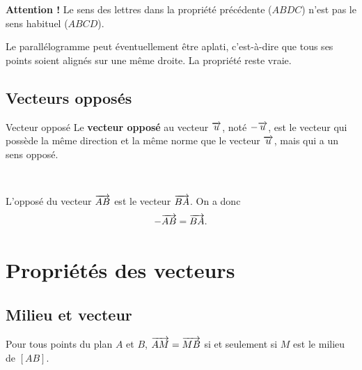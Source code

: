 \documentclass[11pt]{article}
\begin{document}
\begin{rmq}
  \textbf{Attention !} Le sens des lettres dans la propriété précédente ($ABDC$)
  n'est pas le sens habituel ($ABCD$).
\end{rmq}%
\vspace{-.5cm}
\begin{rmq}
  Le parallélogramme peut éventuellement être aplati, c'est-à-dire que tous ses
  points soient alignés sur une même droite. La propriété reste vraie.
\end{rmq}
\vspace{-.5cm}

\subsection{Vecteurs opposés}
\begin{defi}{Vecteur opposé}
  Le \textbf{vecteur opposé} au vecteur $\overrightarrow{u}$, noté $-\overrightarrow{u}$, est le
  vecteur qui possède la même direction et la même norme que le vecteur $\overrightarrow{u}$, mais qui a un sens opposé.
\end{defi}
\begin{prop}~\\[-2mm]
  \begin{minipage}[]{.6\textwidth}
  L'opposé du vecteur $\overrightarrow{AB}$ est le vecteur $\overrightarrow{BA}$. On a donc
  \[
    -\overrightarrow{AB} = \overrightarrow{BA}.
  \]
  \end{minipage}
  \begin{minipage}[]{.4\textwidth}
    \begin{center}
    \end{center}
  \end{minipage}
\end{prop}
    
\section{Propriétés des vecteurs}
\subsection{Milieu et vecteur}
\begin{prop}
  Pour tous points du plan $A$ et $B$, $\overrightarrow{AM}=\overrightarrow{MB}$ si et seulement si
  $M$ est le milieu de $[AB]$.
\end{prop}
\end{document}
